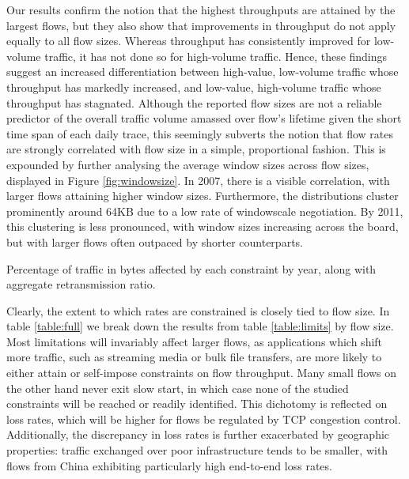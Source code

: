 Our results confirm the notion that the highest throughputs are attained by the largest flows, but they also show that improvements in throughput do not apply equally to all flow sizes. 
Whereas throughput has consistently improved for low-volume traffic, it has not done so for high-volume traffic. 
Hence, these findings suggest an increased differentiation between high-value, low-volume traffic whose throughput has markedly increased, and low-value, high-volume traffic whose throughput has stagnated.
Although the reported flow sizes are not a reliable predictor of the overall traffic volume amassed over flow's lifetime given the short time span of each daily trace, this seemingly subverts the notion that flow rates are strongly correlated with flow size in a simple, proportional fashion.  
This is expounded by further analysing the average window sizes across flow sizes, displayed in Figure \ref{fig:windowsize}.
In 2007, there is a visible correlation, with larger flows attaining higher window sizes.
Furthermore, the distributions cluster prominently around 64KB due to a low rate of windowscale negotiation.
By 2011, this clustering is less pronounced, with window sizes increasing across the board, but with larger flows often outpaced by shorter counterparts.



\begin{table}\footnotesize
\centering
\caption{
Percentage of traffic in bytes affected by each constraint by year, along with aggregate retransmission ratio.}
\label{table:full}
\end{table}

Clearly, the extent to which rates are constrained is closely tied to flow size. 
In table \ref{table:full} we break down the results from table \ref{table:limits} by flow size. 
Most limitations will invariably affect larger flows, as applications which shift more traffic, such as streaming media or bulk file transfers, are more likely to either attain or self-impose constraints on flow throughput. 
Many small flows on the other hand never exit slow start, in which case none of the studied constraints will be reached or readily identified. 
This dichotomy is reflected on loss rates, which will be higher for flows be regulated by \ac{TCP} congestion control.
Additionally, the discrepancy in loss rates is further exacerbated by geographic properties: traffic exchanged over poor infrastructure tends to be smaller, with flows from China exhibiting particularly high end-to-end loss rates. 

